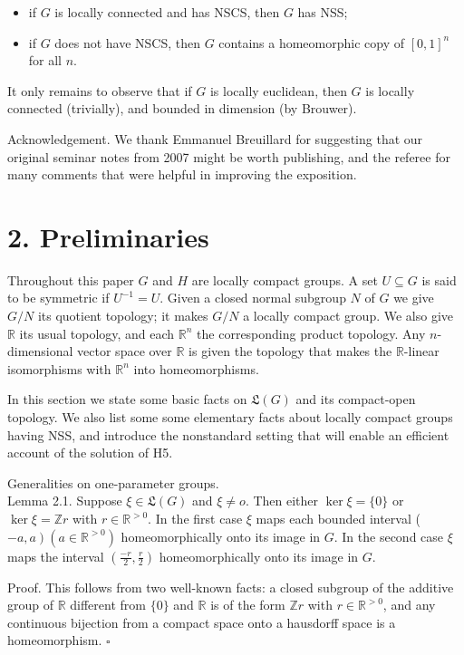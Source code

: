 \documentclass[10pt]{article}
\begin{document}
\begin{itemize}
  \item[-] if $G$ is locally connected and has NSCS, then $G$ has NSS;
  \item[-] if $G$ does not have NSCS, then $G$ contains a homeomorphic copy of $[0,1]^{n}$ for all $n$.
\end{itemize}

It only remains to observe that if $G$ is locally euclidean, then $G$ is locally connected (trivially), and bounded in dimension (by Brouwer).

Acknowledgement. We thank Emmanuel Breuillard for suggesting that our original seminar notes from 2007 might be worth publishing, and the referee for many comments that were helpful in improving the exposition.

\section*{2. Preliminaries}
Throughout this paper $G$ and $H$ are locally compact groups. A set $U \subseteq G$ is said to be symmetric if $U^{-1}=U$. Given a closed normal subgroup $N$ of $G$ we give $G / N$ its quotient topology; it makes $G / N$ a locally compact group. We also give $\mathbb{R}$ its usual topology, and each $\mathbb{R}^{n}$ the corresponding product topology. Any $n$-dimensional vector space over $\mathbb{R}$ is given the topology that makes the $\mathbb{R}$-linear isomorphisms with $\mathbb{R}^{n}$ into homeomorphisms.

In this section we state some basic facts on $\mathfrak{L}(G)$ and its compact-open topology. We also list some some elementary facts about locally compact groups having NSS, and introduce the nonstandard setting that will enable an efficient account of the solution of H5.

Generalities on one-parameter groups.\\
Lemma 2.1. Suppose $\xi \in \mathfrak{L}(G)$ and $\xi \neq o$. Then either $\operatorname{ker} \xi=\{0\}$ or $\operatorname{ker} \xi=\mathbb{Z} r$ with $r \in \mathbb{R}^{>0}$. In the first case $\xi$ maps each bounded interval ( $\left.-a, a\right)\left(a \in \mathbb{R}^{>0}\right)$ homeomorphically onto its image in $G$. In the second case $\xi$ maps the interval $\left(\frac{-r}{2}, \frac{r}{2}\right)$ homeomorphically onto its image in $G$.

Proof. This follows from two well-known facts: a closed subgroup of the additive group of $\mathbb{R}$ different from $\{0\}$ and $\mathbb{R}$ is of the form $\mathbb{Z} r$ with $r \in \mathbb{R}^{>0}$, and any continuous bijection from a compact space onto a hausdorff space is a homeomorphism. \(\square\)
\end{document}
